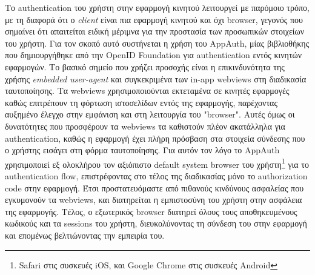 \documentclass[../thesis.tex]{subfiles}
\begin{document}
Το authentication του χρήστη στην εφαρμογή κινητού λειτουργεί με παρόμοιο τρόπο, με τη διαφορά ότι ο \textit{client} είναι πια εφαρμογή κινητού και όχι browser, γεγονός που σημαίνει ότι απαιτείται ειδική μέριμνα για την προστασία των προσωπικών στοιχείων του χρήστη.
Για τον σκοπό αυτό συστήνεται η χρήση του AppAuth, μίας βιβλιοθήκης που δημιουργήθηκε από την OpenID Foundation για authentication εντός κινητών εφαρμογών.
Το βασικό σημείο που χρήζει προσοχής είναι η επικινδυνότητα της χρήσης \textit{embedded user-agent} και συγκεκριμένα των in-app webviews στη διαδικασία ταυτοποίησης.
Τα webviews χρησιμοποιούνται εκτεταμένα σε κινητές εφαρμογές καθώς επιτρέπουν τη φόρτωση ιστοσελίδων εντός της εφαρμογής, παρέχοντας αυξημένο έλεγχο στην εμφάνιση και στη λειτουργία του "browser".
Αυτές όμως οι δυνατότητες που προσφέρουν τα webviews τα καθιστούν πλέον ακατάλληλα για authentication, καθώς η εφαρμογή έχει πλήρη πρόσβαση στα στοιχεία σύνδεσης που ο χρήστης εισάγει στη φόρμα ταυτοποίησης.\cite[\S8.12]{rfc8252}
Για αυτόν τον λόγο το AppAuth χρησιμοποιεί εξ ολοκλήρου τον αξιόπιστο default system browser του χρήστη\footnote{Safari στις συσκευές iOS, και Google Chrome στις συσκευές Android} για το authentication flow, επιστρέφοντας στο τέλος της διαδικασίας μόνο το authorization code στην εφαρμογή.
Έτσι προστατευόμαστε από πιθανούς κινδύνους ασφαλείας που εγκυμονούν τα webviews, και διατηρείται η εμπιστοσύνη του χρήστη στην ασφάλεια της εφαρμογής.
Τέλος, ο εξωτερικός browser διατηρεί όλους τους αποθηκευμένους κωδικούς και τα sessions του χρήστη, διευκολύνοντας τη σύνδεση του στην εφαρμογή και επομένως βελτιώνοντας την εμπειρία του.
\end{document}
